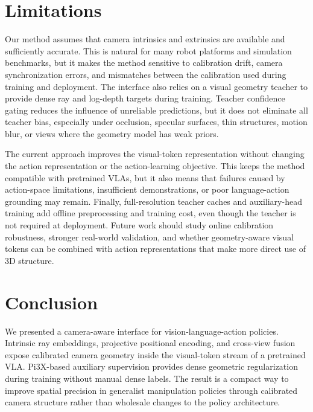 \documentclass{article}
\begin{document}
\section{Limitations}
\label{sec:limitations}
Our method assumes that camera intrinsics and extrinsics are available and sufficiently accurate. This is natural for many robot platforms and simulation benchmarks, but it makes the method sensitive to calibration drift, camera synchronization errors, and mismatches between the calibration used during training and deployment. The interface also relies on a visual geometry teacher to provide dense ray and log-depth targets during training. Teacher confidence gating reduces the influence of unreliable predictions, but it does not eliminate all teacher bias, especially under occlusion, specular surfaces, thin structures, motion blur, or views where the geometry model has weak priors.

The current approach improves the visual-token representation without changing the action representation or the action-learning objective. This keeps the method compatible with pretrained VLAs, but it also means that failures caused by action-space limitations, insufficient demonstrations, or poor language-action grounding may remain. Finally, full-resolution teacher caches and auxiliary-head training add offline preprocessing and training cost, even though the teacher is not required at deployment. Future work should study online calibration robustness, stronger real-world validation, and whether geometry-aware visual tokens can be combined with action representations that make more direct use of 3D structure.

\section{Conclusion}
\label{sec:conclusion}
We presented a camera-aware interface for vision-language-action policies. Intrinsic ray embeddings, projective positional encoding, and cross-view fusion expose calibrated camera geometry inside the visual-token stream of a pretrained VLA. Pi3X-based auxiliary supervision provides dense geometric regularization during training without manual dense labels. The result is a compact way to improve spatial precision in generalist manipulation policies through calibrated camera structure rather than wholesale changes to the policy architecture.



\clearpage


\end{document}
